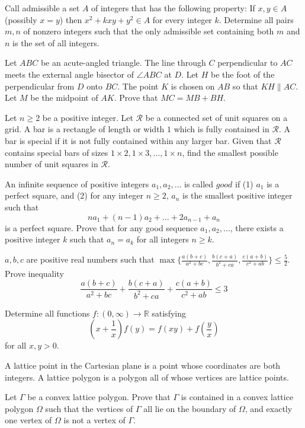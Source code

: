 \documentclass[11pt]{scrartcl}
\begin{document}
\begin{problem}[5407986531182333567]
	Call admissible a set $A$ of integers that has the following property:
If $x,y \in A$ (possibly $x=y$) then $x^2+kxy+y^2 \in A$ for every integer $k$.
Determine all pairs $m,n$ of nonzero integers such that the only admissible set containing both $m$ and $n$ is the set of all integers.
\end{problem}
\begin{problem}[5441518070935718077]
	Let $ABC$ be an acute-angled triangle. The line through $C$ perpendicular to $AC$ meets the external angle bisector of $\angle ABC$ at $D$. Let $H$ be the foot of the perpendicular from $D$ onto $BC$. The point $K$ is chosen on $AB$ so that $KH \parallel AC$. Let $M$ be the midpoint of $AK$. Prove that $MC = MB + BH$.
\end{problem}
\begin{problem}[5450879444672277193]
Let $n \geq 2$ be a positive integer. Let $\mathcal{R}$ be a connected set of unit squares on a grid. A bar is a rectangle of length or width $1$ which is fully contained in $\mathcal{R}$. A bar is special if it is not fully contained within any larger bar. Given that $\mathcal{R}$ contains special bars of sizes $1 \times 2,1 \times 3,\ldots,1 \times n$, find the smallest possible number of unit squares in $\mathcal{R}$.
\end{problem}
\begin{problem}[5458049157791318449]
	An infinite sequence of positive integers $a_1, a_2, \dots$ is called $good$ if
(1) $a_1$ is a perfect square, and
(2) for any integer $n \ge 2$, $a_n$ is the smallest positive integer such that$$na_1 + (n-1)a_2 + \dots + 2a_{n-1} + a_n$$is a perfect square.
Prove that for any good sequence $a_1, a_2, \dots$, there exists a positive integer $k$ such that $a_n=a_k$ for all integers $n \ge k$.
\end{problem}
\begin{problem}[5513377420554471733]
$a,b,c$ are positive real numbers such that $\max\{\frac{a(b+c)}{a^2+bc},\frac{b(c+a)}{b^2+ca},\frac{c(a+b)}{c^2+ab}\}\le \frac{5}{2}$. Prove inequality$$\frac{a(b+c)}{a^2+bc}+\frac{b(c+a)}{b^2+ca}+\frac{c(a+b)}{c^2+ab}\le 3$$
\end{problem}
\begin{problem}[5514383858686655851]
Determine all functions $f:(0,\infty)\to\mathbb{R}$ satisfying$$\left(x+\frac{1}{x}\right)f(y)=f(xy)+f\left(\frac{y}{x}\right)$$for all $x,y>0$.
\end{problem}
\begin{problem}[5562895031008938211]
A lattice point in the Cartesian plane is a point whose coordinates are both integers. A lattice polygon is a polygon all of whose vertices are lattice points.

Let $\Gamma$ be a convex lattice polygon. Prove that $\Gamma$ is contained in a convex lattice polygon $\Omega$ such that the vertices of $\Gamma$ all lie on the boundary of $\Omega$, and exactly one vertex of $\Omega$ is not a vertex of $\Gamma$.
\end{problem}
\end{document}
